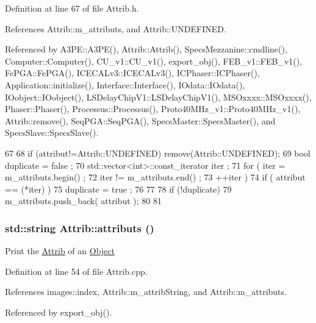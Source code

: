 Definition at line 67 of file Attrib.h.

References Attrib::m\_\-attributs, and Attrib::UNDEFINED.

Referenced by A3PE::A3PE(), Attrib::Attrib(), SpecsMezzanine::cmdline(), Computer::Computer(), CU\_\-v1::CU\_\-v1(), export\_\-obj(), FEB\_\-v1::FEB\_\-v1(), FePGA::FePGA(), ICECALv3::ICECALv3(), ICPhaser::ICPhaser(), Application::initialize(), Interface::Interface(), IOdata::IOdata(), IOobject::IOobject(), LSDelayChipV1::LSDelayChipV1(), MSOxxxx::MSOxxxx(), Phaser::Phaser(), Processus::Processus(), Proto40MHz\_\-v1::Proto40MHz\_\-v1(), Attrib::remove(), SeqPGA::SeqPGA(), SpecsMaster::SpecsMaster(), and SpecsSlave::SpecsSlave().


\begin{DoxyCode}
67                             {
68     if (attribut!=Attrib::UNDEFINED) remove(Attrib::UNDEFINED);
69     bool duplicate = false ;
70     std::vector<int>::const_iterator iter ;
71     for ( iter  = m_attributs.begin() ;
72           iter != m_attributs.end()   ;
73           ++iter ) {
74       if ( attribut == (*iter) ) {
75         duplicate = true ;
76       }
77     }
78     if (!duplicate) {
79       m_attributs.push_back( attribut );
80     }
81   }
\end{DoxyCode}
\hypertarget{classAttrib_aee7bbf16b144887f196e1341b24f8a26}{
\subsubsection[{attributs}]{\setlength{\rightskip}{0pt plus 5cm}std::string Attrib::attributs ()}}
\label{classAttrib_aee7bbf16b144887f196e1341b24f8a26}
Print the \hyperlink{classAttrib}{Attrib} of an \hyperlink{classObject}{Object} 

Definition at line 54 of file Attrib.cpp.

References images::index, Attrib::m\_\-attribString, and Attrib::m\_\-attributs.

Referenced by export\_\-obj().


